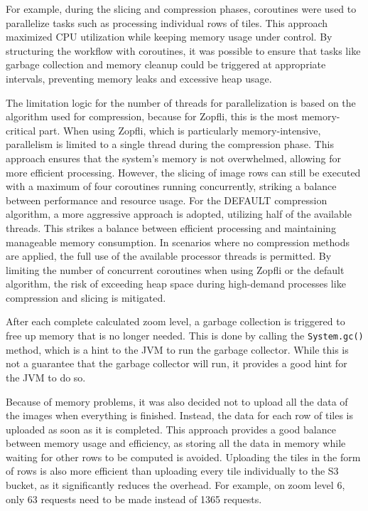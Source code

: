 For example, during the slicing and compression phases, coroutines were used to parallelize tasks such as processing individual rows of tiles. This approach maximized CPU utilization while keeping memory usage under control. By structuring the workflow with coroutines, it was possible to ensure that tasks like garbage collection and memory cleanup could be triggered at appropriate intervals, preventing memory leaks and excessive heap usage.

The limitation logic for the number of threads for parallelization is based on the algorithm used for compression, because for Zopfli, this is the most memory-critical part. When using Zopfli, which is particularly memory-intensive, parallelism is limited to a single thread during the compression phase. This approach ensures that the system's memory is not overwhelmed, allowing for more efficient processing. However, the slicing of image rows can still be executed with a maximum of four coroutines running concurrently, striking a balance between performance and resource usage. For the DEFAULT compression algorithm, a more aggressive approach is adopted, utilizing half of the available threads. This strikes a balance between efficient processing and maintaining manageable memory consumption. In scenarios where no compression methods are applied, the full use of the available processor threads is permitted. By limiting the number of concurrent coroutines when using Zopfli or the default algorithm, the risk of exceeding heap space during high-demand processes like compression and slicing is mitigated.

After each complete calculated zoom level, a garbage collection is triggered to free up memory that is no longer needed. This is done by calling the \texttt{System.gc()} method, which is a hint to the JVM to run the garbage collector. While this is not a guarantee that the garbage collector will run, it provides a good hint for the JVM to do so.

Because of memory problems, it was also decided not to upload all the data of the images when everything is finished. Instead, the data for each row of tiles is uploaded as soon as it is completed. This approach provides a good balance between memory usage and efficiency, as storing all the data in memory while waiting for other rows to be computed is avoided. Uploading the tiles in the form of rows is also more efficient than uploading every tile individually to the S3 bucket, as it significantly reduces the overhead. For example, on zoom level 6, only 63 requests need to be made instead of 1365 requests.